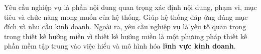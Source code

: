 Yêu cầu nghiệp vụ là phần nội dung quan trọng xác định nội dung, phạm vi, mục tiêu và chức năng mong muốn của hệ thống. Giúp hệ thống đáp ứng đúng mục đích và nhu cầu kinh doanh.      Ngoài ra, yêu cầu nghiệp vụ là yếu tố quan trọng trong thiết kế hướng miền vì thiết kế hướng miền là một phương pháp thiết kế phần mềm tập trung vào việc hiểu và mô hình hóa \textbf{lĩnh vực kinh doanh}.